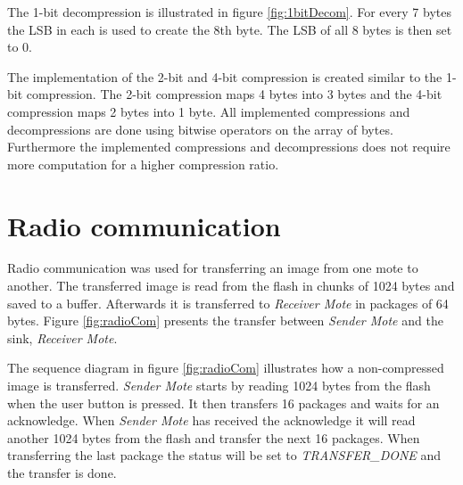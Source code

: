 The 1-bit decompression is illustrated in figure \ref{fig:1bitDecom}. For every 7 bytes the LSB in each is used to create the 8th byte. The LSB of all 8 bytes is then set to 0.



The implementation of the 2-bit and 4-bit compression is created similar to the 1-bit compression. The 2-bit compression maps 4 bytes into 3 bytes and the 4-bit compression maps 2 bytes into 1 byte.
\FloatBarrier
All implemented compressions and decompressions are done using bitwise operators on the array of bytes. Furthermore the implemented compressions and decompressions does not require more computation for a higher compression ratio.


\section{Radio communication}
Radio communication was used for transferring an image from one mote to another. The transferred image is read from the flash in chunks of 1024 bytes and saved to a buffer. Afterwards it is transferred to \emph{Receiver Mote} in packages of 64 bytes. Figure \ref{fig:radioCom} presents the transfer between \emph{Sender Mote} and the sink, \emph{Receiver Mote}.






The sequence diagram in figure \ref{fig:radioCom} illustrates how a non-compressed image is transferred. \emph{Sender Mote} starts by reading 1024 bytes from the flash when the user button is pressed. It then transfers 16 packages and waits for an acknowledge. When \emph{Sender Mote} has received the acknowledge it will read another 1024 bytes from the flash and transfer the next 16 packages. When transferring the last package the status will be set to \emph{TRANSFER\_DONE} and the transfer is done.

\FloatBarrier



